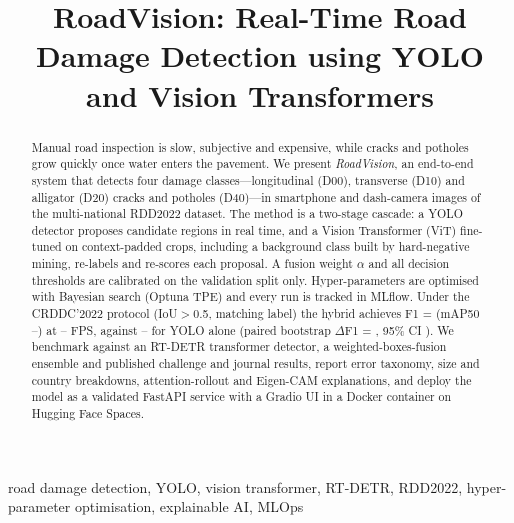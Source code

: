 \IfFileExists{IEEEtran.cls}{\documentclass[conference]{IEEEtran}}%
\providecommand{\HybMAP}{--}\providecommand{\HybFPS}{--}\providecommand{\YoloF}{--}
\begin{document}
\title{RoadVision: Real-Time Road Damage Detection using YOLO and Vision Transformers}

\author{
}

\maketitle

\begin{abstract}
Manual road inspection is slow, subjective and expensive, while cracks and potholes grow quickly once water enters the pavement. We present \emph{RoadVision}, an end-to-end system that detects four damage classes---longitudinal (D00), transverse (D10) and alligator (D20) cracks and potholes (D40)---in smartphone and dash-camera images of the multi-national RDD2022 dataset. The method is a two-stage cascade: a YOLO detector proposes candidate regions in real time, and a Vision Transformer (ViT) fine-tuned on context-padded crops, including a background class built by hard-negative mining, re-labels and re-scores each proposal. A fusion weight $\alpha$ and all decision thresholds are calibrated on the validation split only. Hyper-parameters are optimised with Bayesian search (Optuna TPE) and every run is tracked in MLflow. Under the CRDDC'2022 protocol (IoU$>$0.5, matching label) the hybrid achieves F1 = \HybF{} (mAP50 \HybMAP{}) at \HybFPS{} FPS, against \YoloF{} for YOLO alone (paired bootstrap $\Delta$F1 = \DeltaF{}, 95\% CI \DeltaCI{}). %
We benchmark against an RT-DETR transformer detector, a weighted-boxes-fusion ensemble and published challenge and journal results, report error taxonomy, size and country breakdowns, attention-rollout and Eigen-CAM explanations, and deploy the model as a validated FastAPI service with a Gradio UI in a Docker container on Hugging Face Spaces.
\end{abstract}

\begin{IEEEkeywords}
road damage detection, YOLO, vision transformer, RT-DETR, RDD2022, hyper-parameter optimisation, explainable AI, MLOps
\end{IEEEkeywords}
\end{document}
